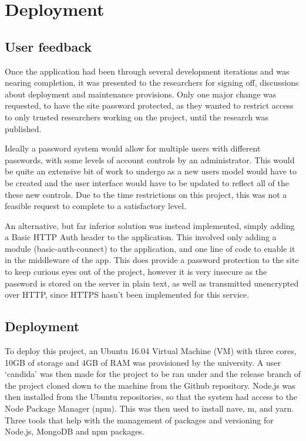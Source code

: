 \chapter{Deployment}


\section{User feedback}
Once the application had been through several development iterations and was nearing completion, it was presented to the researchers for signing off, discussions about deployment and maintenance provisions. Only one major change was requested, to have the site password protected, as they wanted to restrict access to only trusted researchers working on the project, until the research was published.

Ideally a password system would allow for multiple users with different passwords, with some levels of account controls by an administrator. This would be quite an extensive bit of work to undergo as a new users model would have to be created and the user interface would have to be updated to reflect all of the these new controls. Due to the time restrictions on this project, this was not a feasible request to complete to a satisfactory level.

An alternative, but far inferior solution was instead implemented, simply adding a Basic HTTP Auth header to the application. This involved only adding a module (basic-auth-connect) to the application, and one line of code to enable it in the middleware of the app. This does provide a password protection to the site to keep curious eyes out of the project, however it is very insecure as the password is stored on the server in plain text, as well as transmitted unencrypted over HTTP, since HTTPS hasn't been implemented for this service. 

\section{Deployment}
To deploy this project, an Ubuntu 16.04 Virtual Machine (VM) with three cores, 10GB of storage and 4GB of RAM was provisioned by the university. A user `candida' was then made for the project to be ran under and the release branch of the project cloned down to the machine from the Github repository. Node.js was then installed from the Ubuntu repositories, so that the system had access to the Node Package Manager (npm). This was then used to install nave\cite{nave}, m\cite{m}, and yarn\cite{yarn}. Three tools that help with the management of packages and versioning for Node.js, MongoDB and npm packages.

